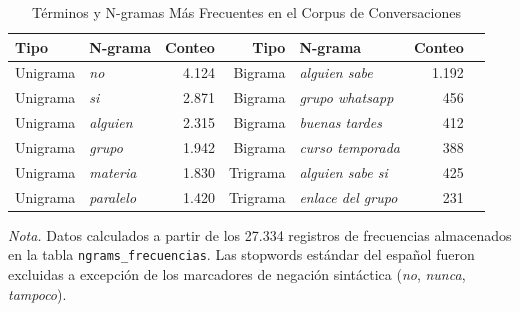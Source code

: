 \begin{table}[htbp]
  \centering
  \small
  \caption{Términos y N-gramas Más Frecuentes en el Corpus de Conversaciones}
  \label{tab:v2_ngrams}
  \begin{tabular}{llrrlrr}
    \toprule
    Tipo & N-grama & Conteo & Tipo & N-grama & Conteo \\
    \midrule
    Unigrama  & \textit{no}             & 4.124 & Bigrama  & \textit{alguien sabe}     & 1.192 \\
    Unigrama  & \textit{si}             & 2.871 & Bigrama  & \textit{grupo whatsapp}   & 456   \\
    Unigrama  & \textit{alguien}        & 2.315 & Bigrama  & \textit{buenas tardes}    & 412   \\
    Unigrama  & \textit{grupo}          & 1.942 & Bigrama  & \textit{curso temporada}  & 388   \\
    Unigrama  & \textit{materia}        & 1.830 & Trigrama & \textit{alguien sabe si}  & 425   \\
    Unigrama  & \textit{paralelo}       & 1.420 & Trigrama & \textit{enlace del grupo} & 231   \\
    \bottomrule
  \end{tabular}
  \vspace{4pt}
  \begin{minipage}{0.92\textwidth}
    \footnotesize
    \textit{Nota.} Datos calculados a partir de los 27.334 registros de frecuencias almacenados en la tabla \texttt{ngrams\_frecuencias}. Las stopwords estándar del español fueron excluidas a excepción de los marcadores de negación sintáctica (\emph{no}, \emph{nunca}, \emph{tampoco}).
  \end{minipage}
\end{table}
